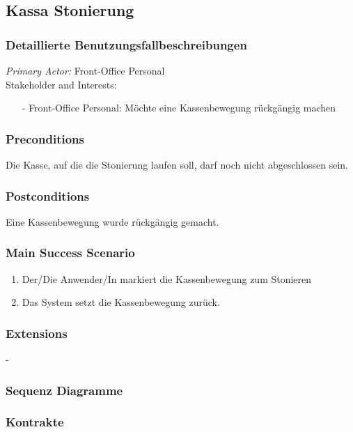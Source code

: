 \documentclass[./detailed_overview_usecases.tex]{subfiles}
\begin{document}
    \subsection{Kassa Stonierung}
    \subsubsection{Detaillierte Benutzungsfallbeschreibungen}
    \textit{Primary Actor:}
    Front-Office Personal
    \\
    Stakeholder and Interests:
    \begin{itemize}
        \item[-] Front-Office Personal: Möchte eine Kassenbewegung rückgängig machen
    \end{itemize}

    \subsubsection*{Preconditions}
    Die Kasse, auf die die Stonierung laufen soll, darf noch nicht abgeschlossen sein.

    \subsubsection*{Postconditions}
    Eine Kassenbewegung wurde rückgängig gemacht.

    \subsubsection*{Main Success Scenario}
    \begin{enumerate}
        \item Der/Die Anwender/In markiert die Kassenbewegung zum Stonieren
        \item Das System setzt die Kassenbewegung zurück.
    \end{enumerate}

    \subsubsection*{Extensions}
    -

    \subsubsection{Sequenz Diagramme}
    \subsubsection{Kontrakte}
\end{document}

